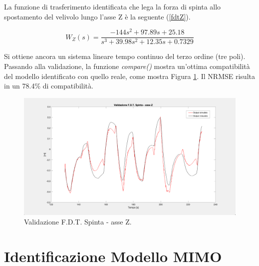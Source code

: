 La funzione di trasferimento identificata che lega la forza di spinta allo spostamento del velivolo lungo l'asse Z è la seguente (\ref{fdtZ}).

\begin{equation}
	W_Z(s) = \frac{-144s^2 + 97.89s + 25.18}{s^3 + 39.98s^2 + 12.35s + 0.7329}
	\label{fdtZ}
\end{equation}

Si ottiene ancora un sistema lineare tempo continuo del terzo ordine (tre poli).\\

Passando alla validazione, la funzione \emph{compare()} \cite{compare} mostra un'ottima compatibilità del modello identificato con quello reale, come mostra Figura \ref{fig:tz_model}. Il \acs{NRMSE} risulta in un 78.4\% di compatibilità.

\begin{figure}[H]
	\centering
	\includegraphics[width=1\textwidth]{gfx/SysId/tz_model}
	\caption[Validazione F.D.T. Spinta - asse Z.]{Validazione F.D.T. Spinta - asse Z.}
	\label{fig:tz_model}
\end{figure}

\section{Identificazione Modello MIMO}

